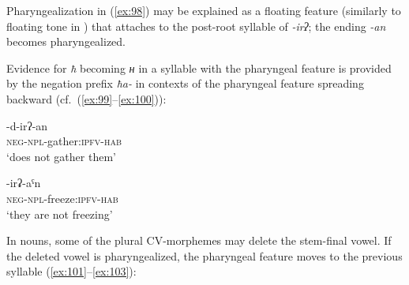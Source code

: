 \documentclass[output=paper]{langsci/langscibook}
\begin{document}
Pharyngealization in (\ref{ex:98}) may be explained as a floating feature
(similarly to floating tone in \citealt{goldsmith1976}) %
that attaches to
the post-root syllable of \emph{-irʔ}; the ending \emph{-an} becomes
pharyngealized.

Evidence for \emph{ħ} becoming \emph{ʜ} in a syllable with the
pharyngeal feature is provided by the negation prefix \emph{ħa-} in
contexts of the pharyngeal feature spreading backward (cf.\ (\ref{ex:99}–\ref{ex:100})):

\ea \label{ex:99} %
-{d-irʔ-an}\\
\textsc{neg}-\textsc{npl}-gather:\textsc{ipfv}-\textsc{hab}\\
\glt `does not gather them'

\ex \label{ex:100} %
-{irʡ-aˤn}\\
\textsc{neg}-\textsc{npl}-freeze:\textsc{ipfv}-\textsc{hab}\\
\glt  `they are not freezing'
\z

In nouns, some of the plural CV-morphemes may delete the stem-final
vowel. If the deleted vowel is pharyngealized, the pharyngeal feature
moves to the previous syllable (\ref{ex:101}–\ref{ex:103}):


\ea \label{ex:101}
  \ea  %
%
  \exsameline %
\z

\ex \label{ex:102} %
  \ea {}
%  
\exsameline %
\z

\ex \label{ex:103} %
\ea  {}
%  
\exsameline %
\z
\z
\end{document}
